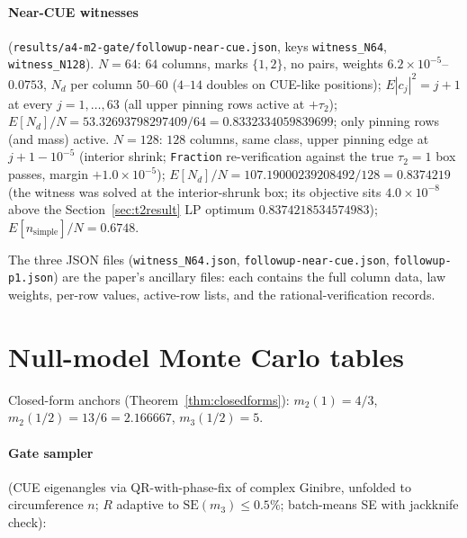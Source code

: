 \documentclass[11pt]{article}
\theoremstyle{plain}
\theoremstyle{definition}
\theoremstyle{remark}
\newcommand{\Nd}{N_{d}}
\begin{document}
\paragraph{Near-CUE witnesses}
(\texttt{results/a4-m2-gate/}\allowbreak\texttt{followup-near-cue.json}, keys
\texttt{witness\_N64}, \texttt{witness\_N128}). $N = 64$: $64$ columns, marks
$\{1, 2\}$, no pairs, weights $6.2 \times 10^{-5}$--$0.0753$, $\Nd$ per column
$50$--$60$ ($4$--$14$ doubles on CUE-like positions); $E|c_j|^2 = j + 1$ at every
$j = 1, \ldots, 63$ (all upper pinning rows active at $+\tau_2$);
$E[\Nd]/N = 53.32693798297409/64 = 0.8332334059839699$; only pinning rows (and
mass) active. $N = 128$: $128$ columns, same class, upper pinning edge at
$j + 1 - 10^{-5}$ (interior shrink; \texttt{Fraction} re-verification against the
true $\tau_2 = 1$ box passes, margin $+1.0 \times 10^{-5}$);
$E[\Nd]/N = 107.19000239208492/128 = 0.8374219$ (the witness was solved at the
interior-shrunk box; its objective sits $4.0 \times 10^{-8}$ above the
Section~\ref{sec:t2result} LP optimum $0.8374218534574983$);
$E[n_{\mathrm{simple}}]/N = 0.6748$.

The three JSON files (\texttt{witness\_N64.json},
\texttt{followup-near-cue.json}, \texttt{followup-p1.json}) are the paper's
ancillary files: each contains the full column data, law weights, per-row values,
active-row lists, and the rational-verification records.

\section{Null-model Monte Carlo tables}
\label{app:mc}

Closed-form anchors (Theorem~\ref{thm:closedforms}): $m_2(1) = 4/3$,
$m_2(1/2) = 13/6 = 2.166667$, $m_3(1/2) = 5$.

\paragraph{Gate sampler}
(CUE eigenangles via QR-with-phase-fix of complex Ginibre, unfolded to
circumference $n$; $R$ adaptive to $\mathrm{SE}(m_3) \le 0.5\%$; batch-means SE
with jackknife check):
\end{document}
